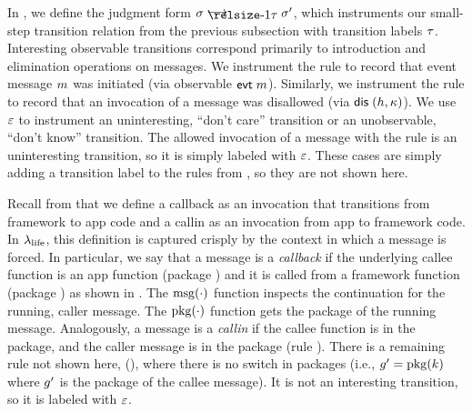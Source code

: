 \documentclass[10pt,reprint,nocopyrightspace,numbers]{sigplanconf}
\begin{document}
In , we define the judgment form $\jstepins{\state}{\state'}$, which instruments our small-step transition relation from the previous subsection with transition labels $\tau$.
%
Interesting observable transitions correspond primarily to introduction and elimination operations on messages.
We instrument the  rule to record that event message $m$ was initiated (via observable $\mathsf{evt}\;m$).
Similarly, we instrument the  rule to record that an invocation of a message was disallowed (via $\mathsf{dis}\;(h,\kappa)$).
We use $\varepsilon$ to instrument an uninteresting, ``don't care'' transition or an unobservable, ``don't know'' transition.
The allowed invocation of a message with the  rule is an uninteresting transition, so it is simply labeled with $\varepsilon$.
These cases are simply adding a transition label to the rules from , so they are not shown here. 

Recall from  that we define a callback as an invocation that transitions from framework to app code and a callin as an invocation from app to framework code.
In $\lambda_{\text{life}}$, this definition is captured crisply by the context in which a message is forced.
In particular, we say that a message is a \emph{callback} if the underlying callee function is an app function (package \enkwApp{}) and it is called from a framework function (package \enkwFwk{}) as shown in .
The $\operatorname{msg}(\cdot)$ function inspects the continuation for the running, caller message.
The $\operatorname{pkg}(\cdot)$ function gets the package of the running message.
Analogously, a message is a \emph{callin} if the callee function is in the \enkwFwk{} package, and the caller message is in the \enkwApp{} package (rule ).
There is a remaining rule not shown here, \enkwForce{} (), where there is no switch in packages (i.e., $g' = \operatorname{pkg}(k)$ where $g'$ is the package of the callee message). It is not an interesting transition, so it is labeled with $\varepsilon$.
\end{document}
